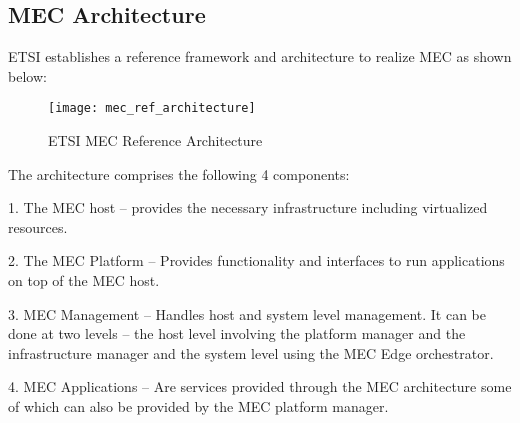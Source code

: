 \subsection{MEC Architecture}
ETSI establishes a reference framework and architecture to realize MEC as shown below:

\begin{figure}
    \centering
    \texttt{[image: mec\_ref\_architecture]}
    \label{fig:figure4}
    \caption{ETSI MEC Reference Architecture}
\end{figure}

The architecture comprises the following 4 components:

1. The MEC host – provides the necessary infrastructure including virtualized resources.

2. The MEC Platform – Provides functionality and interfaces to run applications on top of the MEC host.

3. MEC Management – Handles host and system level management. It can be done at two levels – the host level involving the platform manager and the infrastructure manager and the system level using the MEC Edge orchestrator. 

4. MEC Applications – Are services provided through the MEC architecture some of which can also be provided by the MEC platform manager.
